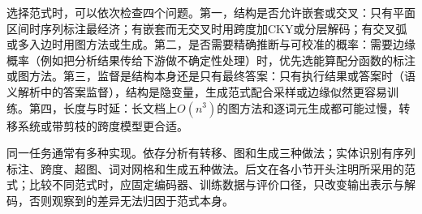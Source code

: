 选择范式时，可以依次检查四个问题。第一，结构是否允许嵌套或交叉：只有平面区间时序列标注最经济；有嵌套而无交叉时用跨度加CKY或分层解码；有交叉弧或多入边时用图方法或生成。第二，是否需要精确推断与可校准的概率：需要边缘概率（例如把分析结果传给下游做不确定性处理）时，优先选能算配分函数的标注或图方法。第三，监督是结构本身还是只有最终答案：只有执行结果或答案时（语义解析中的答案监督），结构是隐变量，生成范式配合采样或边缘似然更容易训练。第四，长度与时延：长文档上$O(n^3)$的图方法和逐词元生成都可能过慢，转移系统或带剪枝的跨度模型更合适。

同一任务通常有多种实现。依存分析有转移、图和生成三种做法；实体识别有序列标注、跨度、超图、词对网格和生成五种做法。后文在各小节开头注明所采用的范式；比较不同范式时，应固定编码器、训练数据与评价口径，只改变输出表示与解码，否则观察到的差异无法归因于范式本身。
